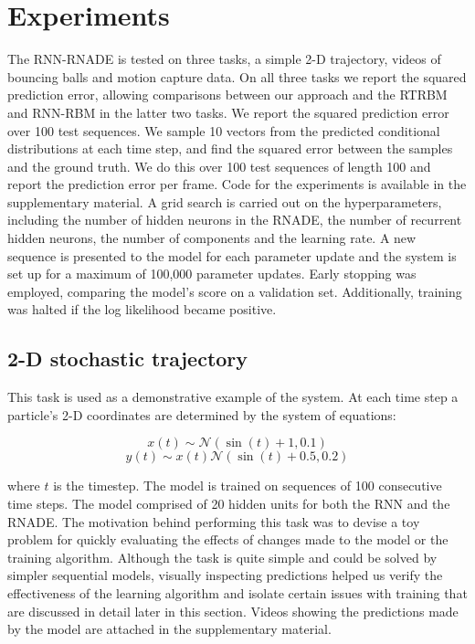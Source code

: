 \documentclass{article} %
\begin{document}
\section{Experiments}
\label{Experiments}
The RNN-RNADE is tested on three tasks, a simple 2-D trajectory, videos of bouncing balls and motion capture data. On all three tasks we report the squared prediction error, allowing comparisons between our approach and the RTRBM and RNN-RBM in the latter two tasks. We report the squared prediction error over 100 test sequences. We sample 10 vectors from the predicted conditional distributions at each time step, and find the squared error between the samples and the ground truth. We do this over 100 test sequences of length 100 and report the prediction error per frame. Code for the experiments is available in the supplementary material.  A grid search is carried out on the hyperparameters, including the number of hidden neurons in the RNADE, the number of recurrent hidden neurons, the number of components and the learning rate. A new sequence is presented to the model for each parameter update and the system is set up for a maximum of 100,000 parameter updates. Early stopping was employed, comparing the model's score on a validation set. Additionally, training was halted if the log likelihood became positive.


\subsection{2-D stochastic trajectory}
This task is used as a demonstrative example of the system. At each time step a particle's 2-D coordinates are determined by the system of equations:


$$x(t) \sim \mathcal{N}(\sin(t)+1,0.1) $$
$$ y(t) \sim x(t)\mathcal{N}(\sin(t)+0.5,0.2)$$


where $t$ is the timestep. The model is trained on sequences of 100 consecutive time steps. The model comprised of 20 hidden units for both the RNN and the RNADE. The motivation behind performing this task was to devise a toy problem for quickly evaluating the effects of changes made to the model or the training algorithm. Although the task is quite simple and could be solved by simpler sequential models, visually inspecting predictions helped us verify the effectiveness of the learning algorithm and isolate certain issues with training that are discussed in detail later in this section. Videos showing the predictions made by the model are attached in the supplementary material. 
\end{document}
